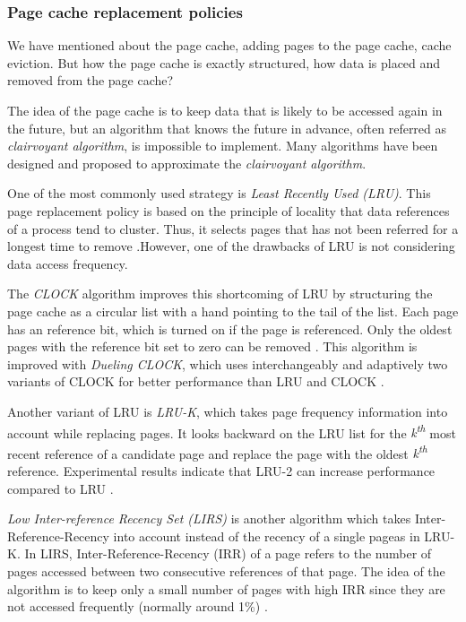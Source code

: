 \subsubsection{Page cache replacement policies}

We have mentioned about the page cache, adding pages to the page cache, 
cache eviction. But how the page cache is exactly structured, how data is 
placed and removed from the page cache?

The idea of the page cache is to keep data that is likely to be accessed again 
in the future, but an algorithm that knows the future in advance, often 
referred as \textit{clairvoyant algorithm}, is impossible to implement. 
Many algorithms have been designed and proposed to approximate the 
\textit{clairvoyant algorithm}. 

One of the most commonly used strategy is \textit{Least Recently Used (LRU)}. 
This page replacement policy is based on the principle of locality that 
data references of a process tend to cluster. Thus, it selects pages that 
has not been referred for a longest time to remove 
\cite{chavan2011comparison}.However, one of the drawbacks of LRU 
is not considering data access frequency.

The \textit{CLOCK} algorithm improves this shortcoming of LRU by 
structuring the page cache as a circular list with a hand pointing to 
the tail of the list.
Each page has an reference bit, which is turned on if the page is referenced. 
Only the oldest pages with the reference bit set to zero can be removed 
\cite{chavan2011comparison}. 
This algorithm is improved with \textit{Dueling CLOCK}, which uses 
interchangeably and adaptively two variants of CLOCK for better 
performance than LRU and CLOCK \cite{chavan2011comparison}.

Another variant of LRU is \textit{LRU-K}, which takes page frequency 
information  into account while replacing pages. It looks backward on the 
LRU list for the \textit{k\textsuperscript{th}} most recent reference of 
a candidate page and replace the page with the oldest 
\textit{k\textsuperscript{th}} reference. 
Experimental results indicate that LRU-2 can increase performance 
compared to LRU \cite{chavan2011comparison}. 

\textit{Low Inter-reference Recency Set (LIRS)} is another algorithm 
which takes Inter-Reference-Recency into account instead of the recency 
of a single pageas in LRU-K. 
In LIRS, Inter-Reference-Recency (IRR) of a page refers to the 
number of pages accessed between two consecutive references of that page. 
The idea of the algorithm is to keep only a small number of pages with 
high IRR since they are not accessed frequently (normally around 1\%) 
\cite{chavan2011comparison}. 

